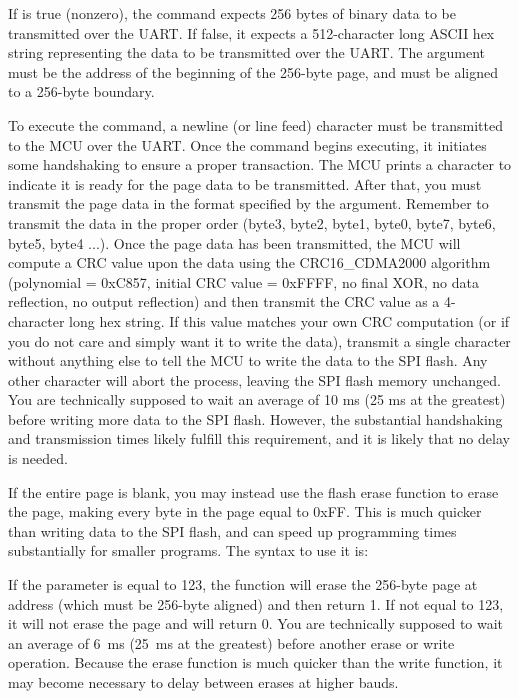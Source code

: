 \documentclass[11pt,pdftex,portrait,letterpaper]{article}
\begin{document}
\noindent{}

If  is true (nonzero), the command expects 256 bytes of binary data to be transmitted over the UART. If false, it expects a 512-character long ASCII hex string representing the data to be transmitted over the UART. The  argument must be the address of the beginning of the 256-byte page, and must be aligned to a 256-byte boundary.

To execute the command, a newline (or line feed) character must be transmitted to the MCU over the UART. Once the command begins executing, it initiates some handshaking to ensure a proper transaction. The MCU prints a \forthinline{\$} character to indicate it is ready for the page data to be transmitted. After that, you must transmit the page data in the format specified by the  argument. Remember to transmit the data in the proper order (byte3, byte2, byte1, byte0, byte7, byte6, byte5, byte4 ...). Once the page data has been transmitted, the MCU will compute a CRC value upon the data using the CRC16\_CDMA2000 algorithm (polynomial = 0xC857, initial CRC value = 0xFFFF, no final XOR, no data reflection, no output reflection) and then transmit the CRC value as a 4-character long hex string. If this value matches your own CRC computation (or if you do not care and simply want it to write the data), transmit a single  character without anything else to tell the MCU to write the data to the SPI flash. Any other character will abort the process, leaving the SPI flash memory unchanged. You are technically supposed to wait an average of 10 ms (25 ms at the greatest) before writing more data to the SPI flash. However, the substantial handshaking and transmission times likely fulfill this requirement, and it is likely that no delay is needed.

If the entire page is blank, you may instead use the flash erase  function to erase the page, making every byte in the page equal to 0xFF. This is much quicker than writing data to the SPI flash, and can speed up programming times substantially for smaller programs. The syntax to use it is:

\noindent{}

If the  parameter is equal to 123, the function will erase the 256-byte page at address  (which must be 256-byte aligned) and then return 1. If not equal to 123, it will not erase the page and will return 0. You are technically supposed to wait an average of 6~ms (25~ms at the greatest) before another erase or write operation. Because the erase function is much quicker than the write function, it may become necessary to delay between erases at higher bauds.
\end{document}
